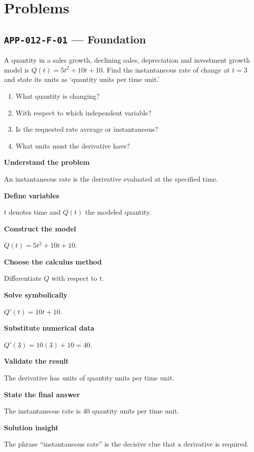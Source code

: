 \documentclass[11pt]{book}
\newcommand{\pid}[1]{\texttt{#1}}
\begin{document}
\section*{Problems}
\subsection*{\pid{APP-012-F-01} — Foundation}
\begin{problembox}
A quantity in a sales growth, declining sales, depreciation and investment growth model is $Q(t)=5t^2+10t+10$. Find the instantaneous rate of change at $t=3$ and state its units as ‘quantity units per time unit.’
\end{problembox}
\begin{promptbox}\begin{enumerate}
\item What quantity is changing?
\item With respect to which independent variable?
\item Is the requested rate average or instantaneous?
\item What units must the derivative have?
\end{enumerate}\end{promptbox}
\begin{solutionbox}
\textbf{Understand the problem}\par An instantaneous rate is the derivative evaluated at the specified time.\par\medskip
\textbf{Define variables}\par $t$ denotes time and $Q(t)$ the modeled quantity.\par\medskip
\textbf{Construct the model}\par $Q(t)=5t^2+10t+10$.\par\medskip
\textbf{Choose the calculus method}\par Differentiate $Q$ with respect to $t$.\par\medskip
\textbf{Solve symbolically}\par $Q'(t)=10t+10$.\par\medskip
\textbf{Substitute numerical data}\par $Q'(3)=10(3)+10=40$.\par\medskip
\textbf{Validate the result}\par The derivative has units of quantity units per time unit.\par\medskip
\textbf{State the final answer}\par The instantaneous rate is $40$ quantity units per time unit.\par\medskip
\textbf{Solution insight}\par The phrase “instantaneous rate” is the decisive clue that a derivative is required.\par\medskip
\end{solutionbox}
\end{document}
